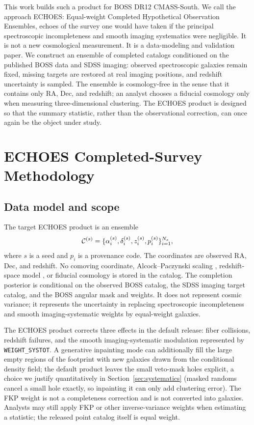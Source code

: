 \documentclass[apj]{emulateapj}
\begin{document}
This work builds such a product for BOSS DR12 CMASS-South.  We call the
approach \textsc{ECHOES}: Equal-weight Completed Hypothetical Observation
Ensembles, echoes of the survey one would have taken if the principal
spectroscopic incompleteness and smooth imaging systematics were negligible.
It is not a new cosmological measurement.  It is a data-modeling and validation
paper.  We construct an ensemble of completed catalogs conditioned on the
published BOSS data and SDSS imaging: observed spectroscopic galaxies remain
fixed, missing targets are restored at real imaging positions, and redshift
uncertainty is sampled.  The ensemble is cosmology-free in the sense that it
contains only RA, Dec, and redshift; an analyst chooses a fiducial cosmology
only when measuring three-dimensional clustering.  The ECHOES product is
designed so that the summary statistic, rather than the observational
correction, can once again be the object under study.

\section{ECHOES Completed-Survey Methodology}
\label{sec:method}

\subsection{Data model and scope}
\label{subsec:datamodel}

The target ECHOES product is an ensemble
\begin{equation}
  {\cal C}^{(s)} =
  \{ \alpha_i^{(s)},\delta_i^{(s)},z_i^{(s)},p_i^{(s)} \}_{i=1}^{N_s},
  \label{eq:catalog}
\end{equation}
where $s$ is a seed and $p_i$ is a provenance code.  The coordinates are
observed RA, Dec, and redshift.  No comoving coordinate, Alcock--Paczynski
scaling \citep{AlcockPaczynski1979}, redshift-space model \citep{Kaiser1987},
or fiducial cosmology is stored in the catalog.  The completion posterior is
conditional on the observed BOSS catalog, the SDSS imaging target catalog, and
the BOSS angular mask and weights.  It does not represent cosmic variance; it
represents the uncertainty in replacing spectroscopic incompleteness and smooth
imaging-systematic weights by equal-weight galaxies.

The ECHOES product corrects three effects in the default release: fiber collisions,
redshift failures, and the smooth imaging-systematic modulation represented by
\texttt{WEIGHT\_SYSTOT}.  A generative inpainting mode can additionally fill the
large empty regions of the footprint with new galaxies drawn from the conditional
density field; the default product leaves the small veto-mask holes explicit, a
choice we justify quantitatively in Section~\ref{sec:systematics} (masked randoms
cancel a small hole exactly, so inpainting it can only add clustering error).  The
FKP weight \citep{FKP1994} is not a completeness correction and is not converted
into galaxies.  Analysts may still apply FKP or other inverse-variance weights
when estimating a statistic; the released point catalog itself is equal weight.
\end{document}
